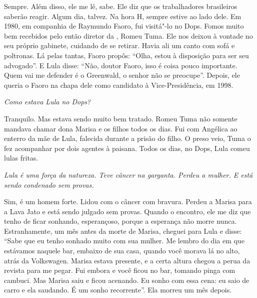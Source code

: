 \normalfont
Sempre. Além disso, ele me lê, sabe. Ele diz que os
trabalhadores brasileiros saberão reagir. Algum dia, talvez. Na hora H,
sempre estive ao lado dele. Em 1980, em companhia de Raymundo Faoro, fui
visitá"-lo no Dops. Fomos muito bem recebidos pelo então diretor da ,
Romeu Tuma. Ele nos deixou à vontade no seu próprio gabinete, cuidando
de se retirar. Havia ali um canto com sofá e poltronas. Lá pelas tantas,
Faoro propôs: ``Olha, estou à disposição para ser seu advogado''. E Lula
disse: ``Não, doutor Faoro, isso é coisa pouco importante. Quem vai me
defender é o Greenwald, o senhor não se preocupe''. Depois, ele queria o
Faoro na chapa dele como candidato à Vice-Presidência, em 1998.

\itshape
 Como estava Lula no Dops?

\normalfont
Tranquilo. Mas estava sendo muito bem tratado. Romeu Tuma
não somente mandava chamar dona Marisa e os filhos todos os dias. Fui
com Angélica ao enterro da mãe de Lula, falecida durante a prisão do
filho. O preso veio, Tuma o fez acompanhar por dois agentes à paisana.
Todos os dias, no Dops, Lula comeu lulas fritas.

\itshape
 Lula é uma força da natureza. Teve câncer na garganta.
Perdeu a mulher. E está sendo condenado sem provas.

\normalfont
Sim, é um homem forte. Lidou com o câncer com bravura.
Perdeu a Marisa para a Lava Jato e está sendo julgado sem provas. Quando
o encontro, ele me diz que tenho de ficar sonhando, esperançoso, porque
a esperança não morre nunca. Estranhamente, um mês antes da morte de
Marisa, cheguei para Lula e disse: ``Sabe que eu tenho sonhado muito com
sua mulher. Me lembro do dia em que estávamos naquele bar, embaixo de
sua casa, quando você morava lá no alto, atrás da Volkswagen. Marisa
estava presente, e a certa altura chegou a perua da revista para me
pegar. Fui embora e você ficou no bar, tomando pinga com cambuci. Mas
Marisa saiu e ficou acenando. Eu sonho com essa cena: eu saio de carro e
ela saudando. É um sonho recorrente''. Ela morreu um mês depois.
